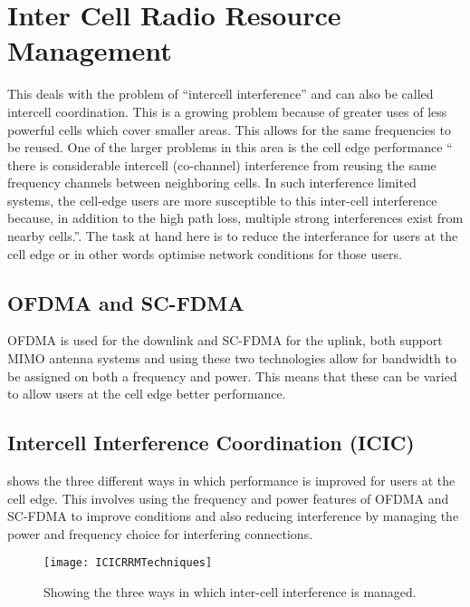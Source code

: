 \section{Inter Cell Radio Resource Management}
{
	This deals with the problem of \enquote{intercell interference}\cite{Choi2010} and can also be called intercell coordination. This is a growing problem because of greater uses of less powerful cells which cover smaller areas. This allows for the same frequencies to be reused. One of the larger problems in this area is the cell edge performance \enquote{ there is considerable intercell (co-channel) interference from reusing the same frequency channels between neighboring cells. In such interference limited systems, the cell-edge users are more susceptible to this inter-cell interference because, in addition to the high path loss, multiple strong interferences exist from nearby cells.}\cite{InterCellInterferenceCoordination6392819}. The task at hand here is to reduce the interferance for users at the cell edge or in other words optimise network conditions for those users.
	\subsection{OFDMA and SC-FDMA}
	{
		OFDMA is used for the downlink and SC-FDMA for the uplink, both support MIMO antenna systems and using these two technologies allow for bandwidth to be assigned on both a frequency and power. This means that these can be varied to allow users at the cell edge better performance.
	}
	\subsection{Intercell Interference Coordination (ICIC)}
	{
		 shows the three different ways in which performance is improved for users at the cell edge. This involves using the frequency and power features of OFDMA and SC-FDMA to improve conditions and also reducing interference by managing the power and frequency choice for interfering connections.
		\begin{figure}
			\centering
			\texttt{[image: ICICRRMTechniques]}
			\caption{Showing the three ways in which inter-cell interference is managed. \cite{InterCellInterferenceCoordination6392819}}
			\label{fig:ICICTechniques}
		\end{figure}
	}
}